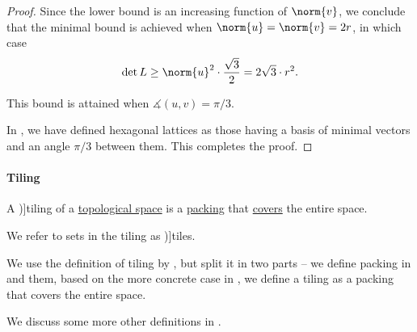 \begin{proof}
  Since the lower bound is an increasing function of \( \norm{v} \), we conclude that the minimal bound is achieved when \( \norm{u} = \norm{v} = 2r \), in which case
  \begin{equation*}
    \det L \geq \norm{u}^2 \cdot \frac {\sqrt 3} 2 = 2\sqrt 3 \cdot r^2.
  \end{equation*}

  This bound is attained when \( \measuredangle(u, v) = \pi / 3 \).

  In , we have defined hexagonal lattices as those having a basis of minimal vectors and an angle \( \pi / 3 \) between them. This completes the proof.
\end{proof}

\paragraph{Tiling}

\begin{definition}\label{def:topological_space_tiling}
  A \term[ru=паркет / мозайка (\cite[465]{Маркушевич1967АналитическиеФункцииТом2})]{tiling} of a \hyperref[def:topological_space]{topological space} is a \hyperref[def:topological_space_packing]{packing} that \hyperref[def:set_covering]{covers} the entire space.

  We refer to sets in the tiling as \term[ru=плитка (\cite[465]{Маркушевич1967АналитическиеФункцииТом2})]{tiles}.
\end{definition}
\begin{comments}
  \item We use the definition of tiling by , but split it in two parts -- we define packing in  and them, based on the more concrete case in , we define a tiling as a packing that covers the entire space.

  \item We discuss some more other definitions in .
\end{comments}


